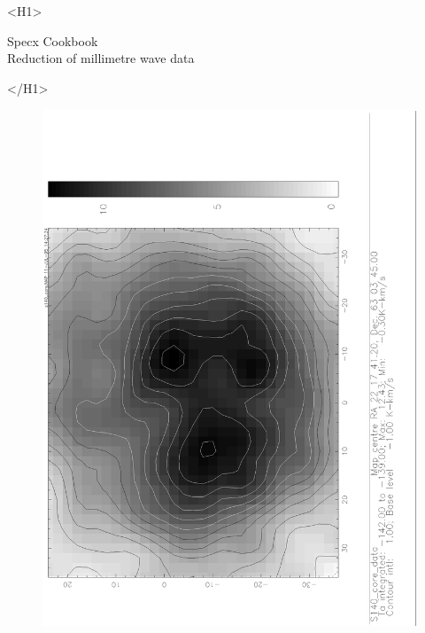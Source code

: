 \documentclass[11pt,twoside]{article}
\newcommand{\stardoctitle}     {Specx Cookbook \\[2ex]
                                Reduction of millimetre wave data}
\newcommand{\stardocversion}   {[software-version]}
\newcommand{\stardocmanual}    {[manual-type]}
\newcommand{\xlabel}[1]{}
\begin{document}
\begin{htmlonly}
   \xlabel{}
   \begin{rawhtml} <H1> \end{rawhtml}
      \stardoctitle\\
   \begin{rawhtml} </H1> \end{rawhtml}

   \begin{figure}[h]
   \includegraphics[angle=-90,width=120mm]{sc8_gray.ps}
   \end{figure}


\end{htmlonly}
\end{document}
